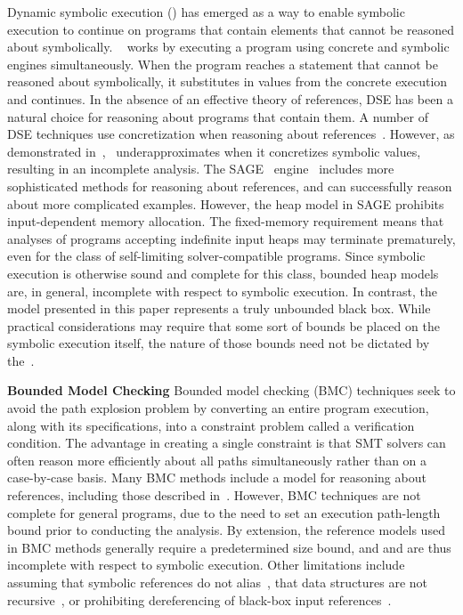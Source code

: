 Dynamic symbolic execution (\dsetxt{}) has emerged as a way to enable symbolic execution to continue on programs that contain elements that cannot be reasoned about symbolically. ~\dsetxt{} works by executing a program using concrete and symbolic engines simultaneously. When the program reaches a statement that cannot be reasoned about symbolically, it substitutes in values from the concrete execution and continues. In the absence of an effective theory of references, DSE has been a natural choice for reasoning about programs that contain them. A number of DSE techniques use concretization when reasoning about references~\cite{Godefroid:2005,Sen:2005,Godefroid:POPL07,Tillmann:2008}. However, as demonstrated in~\cite{Elkarablieh:2009},~\dsetxt{} underapproximates when it concretizes symbolic values, resulting in an incomplete analysis. The SAGE~\dsetxt{} engine~\cite{Elkarablieh:2009} includes more sophisticated methods for reasoning about references, and can successfully reason about more complicated examples. However, the heap model in SAGE prohibits input-dependent memory allocation. The fixed-memory requirement means that analyses of programs accepting indefinite input heaps may terminate prematurely, even for the class of self-limiting solver-compatible programs. Since symbolic execution is otherwise sound and complete for this class, bounded heap models are, in general, incomplete with respect to symbolic execution. In contrast, the~\symtxt{} model presented in this paper represents a truly unbounded black box. While practical considerations may require that some sort of bounds be placed on the symbolic execution itself, the nature of those bounds need not be dictated by the~\symtxt{}.

\noindent\textbf{Bounded Model Checking}
Bounded model checking (BMC) techniques seek to avoid the path explosion problem by converting an entire program execution, along with its specifications, into a constraint problem called a verification condition. The advantage in creating a single constraint is that SMT solvers can often reason more efficiently about all paths simultaneously rather than on a case-by-case basis. Many BMC methods include a model for reasoning about references, including those described in~\cite{Clarke:2004,Barnett:2006,Xie:2005,Babic:2007,Dillig:2011}. However, BMC techniques are not complete for general programs, due to the need to set an execution path-length bound prior to conducting the analysis. By extension, the reference models used in BMC methods generally require a predetermined size bound, and and are thus incomplete with respect to symbolic execution. Other limitations include assuming that symbolic references do not alias~\cite{Xie:2005,Babic:2007}, that data structures are not recursive~\cite{Dillig:2011}, or prohibiting dereferencing of black-box input references~\cite{Clarke:2004}.

